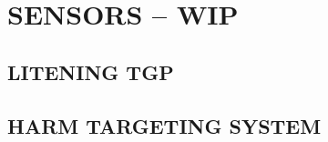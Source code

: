 \chapter{SENSORS -- WIP}
\localtableofcontents
\cleardoublepage

\section{LITENING TGP}

\clearpage 

\section{HARM TARGETING SYSTEM}

\cleardoublepage
